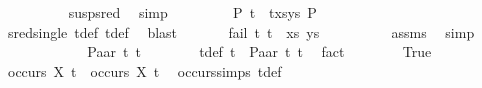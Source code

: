\begin{isabellebody}
\ \ \ \ \ \ \ \ \isamarkupfalse%
\ susp{\isacharunderscore}{\kern0pt}sred\ \isamarkupfalse%
\ simp\isanewline
\ \ \ \ \ \ \isamarkupfalse%
\ {\isachardoublequoteopen}{\isasymexists}\ P{}{\isachardot}{\kern0pt}\ {\isacharparenleft}{\kern0pt}{\isacharparenleft}{\kern0pt}t{}\ {\isasymapprox}{\isacharquery}{\kern0pt}\ t{}{\isacharparenright}{\kern0pt}{\isacharhash}{\kern0pt}xs{\isacharcomma}{\kern0pt}ys{\isacharparenright}{\kern0pt}\ {\isasymTurnstile}{\isacharparenleft}{\kern0pt}{\isacharbraceleft}{\kern0pt}{\isacharbraceright}{\kern0pt}{\isacharcomma}{\kern0pt}{\isacharbrackleft}{\kern0pt}{\isacharbrackright}{\kern0pt}{\isacharparenright}{\kern0pt}{\isasymRightarrow}P{}{\isachardoublequoteclose}\isanewline
\ \ \ \ \ \ \ \ \isamarkupfalse%
\ sred{\isacharunderscore}{\kern0pt}single\ t{}{\isacharunderscore}{\kern0pt}def\ t{}{\isacharunderscore}{\kern0pt}def\ \isamarkupfalse%
\ blast\isanewline
\ \ \ \ \ \ \isamarkupfalse%
{\isachardoublequoteopen}fail\ {\isacharparenleft}{\kern0pt}{\isacharparenleft}{\kern0pt}t{}{\isacharcomma}{\kern0pt}\ t{}{\isacharparenright}{\kern0pt}\ {\isacharhash}{\kern0pt}\ xs{\isacharcomma}{\kern0pt}\ ys{\isacharparenright}{\kern0pt}{\isachardoublequoteclose}\isanewline
\ \ \ \ \ \ \ \ \isamarkupfalse%
\ assms\ \isamarkupfalse%
\ simp\isanewline
\ \ \ \ \isamarkupfalse%
\isanewline
\ \ \ \ \ \ \isamarkupfalse%
\ {\isacharparenleft}{\kern0pt}Paar\ t{}{}\ t{}{}{\isacharparenright}{\kern0pt}\isanewline
\ \ \ \ \ \ \isamarkupfalse%
\ t{}{\isacharunderscore}{\kern0pt}def{\isacharcolon}{\kern0pt}\ {\isachardoublequoteopen}t{}\ {\isacharequal}{\kern0pt}\ Paar\ t{}{}\ t{}{}{\isachardoublequoteclose}\ \isamarkupfalse%
\ fact\isanewline
\ \ \ \ \ \ \isamarkupfalse%
\ True\isanewline
\ \ \ \ \ \ \isamarkupfalse%
\ {\isachardoublequoteopen}occurs\ X\ t{}{}\ {\isasymor}\ occurs\ X\ t{}{}{\isachardoublequoteclose}\ \isamarkupfalse%
\ occurs{\isachardot}{\kern0pt}simps{\isacharparenleft}{\kern0pt}{}{\isacharparenright}{\kern0pt}\ t{}{\isacharunderscore}{\kern0pt}def\ \isamarkupfalse%

\end{isabellebody}

